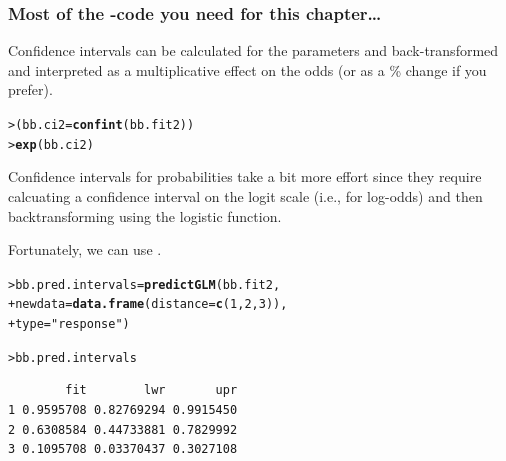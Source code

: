 \documentclass{beamer}\usepackage[]{graphicx}\usepackage[]{xcolor}
\makeatletter
\newcommand{\hlnum}[1]{\textcolor[rgb]{0.686,0.059,0.569}{#1}}%
\newcommand{\hlstr}[1]{\textcolor[rgb]{0.192,0.494,0.8}{#1}}%
\newcommand{\hlstd}[1]{\textcolor[rgb]{0.345,0.345,0.345}{#1}}%
\newcommand{\hlkwb}[1]{\textcolor[rgb]{0.69,0.353,0.396}{#1}}%
\newcommand{\hlkwc}[1]{\textcolor[rgb]{0.333,0.667,0.333}{#1}}%
\newcommand{\hlkwd}[1]{\textcolor[rgb]{0.737,0.353,0.396}{\textbf{#1}}}%
\newenvironment{kframe}{%
 \def\at@end@of@kframe{}%
 \ifinner\ifhmode%
  \def\at@end@of@kframe{\end{minipage}}%
  \begin{minipage}{\columnwidth}%
 \fi\fi%
 \def\FrameCommand##1{\hskip\@totalleftmargin \hskip-\fboxsep
 \colorbox{shadecolor}{##1}\hskip-\fboxsep
     \hskip-\linewidth \hskip-\@totalleftmargin \hskip\columnwidth}%
 \MakeFramed {\advance\hsize-\width
   \@totalleftmargin\z@ \linewidth\hsize
   \@setminipage}}%
 {\par\unskip\endMakeFramed%
 \at@end@of@kframe}
\newenvironment{knitrout}{}{} %
\makeatother
\begin{document}
\begin{frame}[fragile]
\frametitle{Most of the -code you need for this chapter\ldots}
Confidence intervals can be calculated for the parameters and back-transformed and interpreted as a  multiplicative effect on the odds (or as a \% change if you prefer).

\begin{knitrout}\scriptsize
{}\color{fgcolor}\begin{kframe}
\begin{alltt}
\hlstd{> }\hlstd{(bb.ci2} \hlkwb{=} \hlkwd{confint}\hlstd{(bb.fit2))}
\hlstd{> }\hlkwd{exp}\hlstd{(bb.ci2)}
\end{alltt}
\end{kframe}
\end{knitrout}
\bigskip 

Confidence intervals for probabilities take a bit more effort since they
require calcuating a confidence interval on the logit scale (i.e., for log-odds) and then backtransforming using the logistic function. 
\medskip

Fortunately, we can use .

\begin{knitrout}\scriptsize
{}\color{fgcolor}\begin{kframe}
\begin{alltt}
\hlstd{> }\hlstd{bb.pred.intervals} \hlkwb{=} \hlkwd{predictGLM}\hlstd{(bb.fit2,}
\hlstd{+ }                            \hlkwc{newdata} \hlstd{=} \hlkwd{data.frame}\hlstd{(}\hlkwc{distance} \hlstd{=} \hlkwd{c}\hlstd{(}\hlnum{1}\hlstd{,} \hlnum{2}\hlstd{,} \hlnum{3}\hlstd{)),}
\hlstd{+ }                            \hlkwc{type}\hlstd{=}\hlstr{"response"}\hlstd{)}
\end{alltt}


{\ttfamily\noindent\itshape\color{messagecolor}{***Estimates and CIs are on the response scale***}}\begin{alltt}
\hlstd{> }\hlstd{bb.pred.intervals}
\end{alltt}
\begin{verbatim}
        fit        lwr       upr
1 0.9595708 0.82769294 0.9915450
2 0.6308584 0.44733881 0.7829992
3 0.1095708 0.03370437 0.3027108
\end{verbatim}
\end{kframe}
\end{knitrout}
 
\end{frame}
\end{document}
